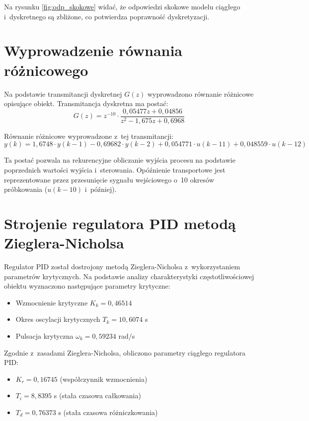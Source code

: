 \documentclass[a4paper,titlepage,11pt,floatssmall]{mwrep}
\begin{document}
Na rysunku \ref{fig:odp_skokowe} widać, że odpowiedzi skokowe modelu ciągłego i~dyskretnego są zbliżone, co potwierdza poprawność dyskretyzacji.

\section{Wyprowadzenie równania różnicowego}

Na podstawie transmitancji dyskretnej $G(z)$ wyprowadzono równanie różnicowe opisujące obiekt. Transmitancja dyskretna ma postać:
\begin{equation}
    G(z) = z^{-10} \cdot \frac{0,05477z + 0,04856}{z^2 - 1,675z + 0,6968}
\end{equation}

Równanie różnicowe wyprowadzone z~tej transmitancji:
\begin{equation}
    y(k) = 1,6748 \cdot y(k-1) - 0,69682 \cdot y(k-2) + 0,054771 \cdot u(k-11) + 0,048559 \cdot u(k-12)
\end{equation}

Ta postać pozwala na rekurencyjne obliczanie wyjścia procesu na podstawie poprzednich wartości wyjścia i~sterowania. Opóźnienie transportowe jest reprezentowane przez przesunięcie sygnału wejściowego o~10 okresów próbkowania ($u(k-10)$ i~później).

\section{Strojenie regulatora PID metodą Zieglera-Nicholsa}

Regulator PID został dostrojony metodą Zieglera-Nicholsa z~wykorzystaniem parametrów krytycznych. Na podstawie analizy charakterystyki częstotliwościowej obiektu wyznaczono następujące parametry krytyczne:
\begin{itemize}
    \item Wzmocnienie krytyczne $K_k = 0,46514$
    \item Okres oscylacji krytycznych $T_k = 10,6074$ s
    \item Pulsacja krytyczna $\omega_k = 0,59234$ rad/s
\end{itemize}

Zgodnie z~zasadami Zieglera-Nicholsa, obliczono parametry ciągłego regulatora PID:
\begin{itemize}
    \item $K_r = 0,16745$ (współczynnik wzmocnienia)
    \item $T_i = 8,8395$ s (stała czasowa całkowania)
    \item $T_d = 0,76373$ s (stała czasowa różniczkowania)
\end{itemize}
\end{document}
